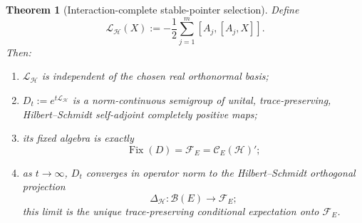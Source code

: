 \documentclass[11pt]{article}
\newtheorem{theorem}{Theorem}[section]
\theoremstyle{definition}
\theoremstyle{remark}
\begin{document}
\begin{theorem}[Interaction-complete stable-pointer selection]
\label{thm:stable-pointer-selection}
Define
\[
 \mathcal L_{\mathscr H}(X)
 :=-\frac12\sum_{j=1}^m[A_j,[A_j,X]].
\]
Then:

\begin{enumerate}[label=\textup{(\roman*)},leftmargin=2.4em]
\item \(\mathcal L_{\mathscr H}\) is independent of the chosen real
orthonormal basis;
\item \(D_t:=e^{t\mathcal L_{\mathscr H}}\) is a norm-continuous semigroup of
unital, trace-preserving, Hilbert--Schmidt self-adjoint completely positive
maps;
\item its fixed algebra is exactly
\[
 \operatorname{Fix}(D)=\mathcal F_E=\mathcal C_E(\mathscr H)';
\]
\item as \(t\to\infty\), \(D_t\) converges in operator norm to the
Hilbert--Schmidt orthogonal projection
\[
 \Delta_{\mathscr H}:\mathcal B(E)\longrightarrow\mathcal F_E;
\]
this limit is the unique trace-preserving conditional expectation onto
\(\mathcal F_E\).
\end{enumerate}
\end{theorem}
\end{document}
